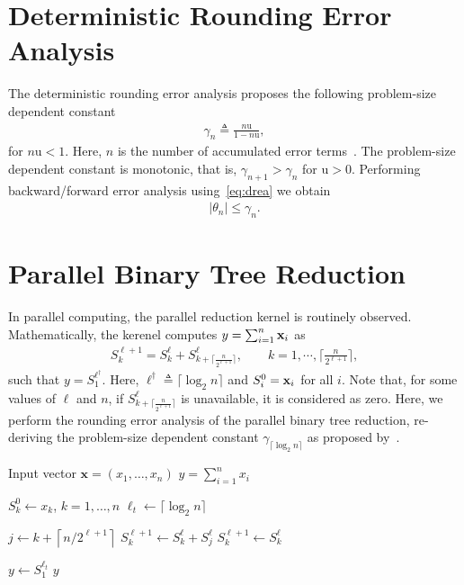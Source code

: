 \documentclass[11pt,draft]{article}
\newcommand{\urd}{\ensuremath{\mathrm{u}}}
\newcommand{\define}{\ensuremath{\triangleq}}
\newcommand{\vect}[1]{\mathbf{\MakeLowercase{#1}}}
\theoremstyle{definition}
\theoremstyle{remark}
\newcommand{\abs}[1]{\left|#1\right|}
\begin{document}
\section{Deterministic Rounding Error Analysis}
The deterministic rounding error analysis proposes the following problem-size dependent constant
\begin{align}
\gamma_{n} \define \frac{n\urd}{1 - n\urd}, 
\label{eq:drea}
\end{align}
for $n\urd < 1$.
Here, $n$ is the number of accumulated error terms~\cite{higham2002accuracy}.
The problem-size dependent constant is monotonic, that is, $\gamma_{n+1} > \gamma_{n}$ for $\urd > 0$.
Performing backward/forward error analysis using~\cref{eq:drea} we obtain
\begin{align}
    \abs{\theta_n} \leq \gamma_n.
\end{align}

\section{Parallel Binary Tree Reduction}\label{sec:parallel_binary_tree_reduction}
In parallel computing, the parallel reduction kernel is routinely observed.
Mathematically, the kerenel computes $y = \sum_{i=1}^n \vect{x}_i$ as
\begin{align}
S_{k}^{\ell+1} = S_{k}^{\ell} + S_{k + \lceil\frac{n}{2^{\ell+1}}\rceil}^\ell, \qquad k = 1, \cdots, \lceil \frac{n}{2^{\ell+1}}\rceil,
\end{align}
such that $y = S_1^{\ell^\dagger}$.
Here, $\ell^\dagger \define \lceil\log_2 n\rceil$ and $S_i^0 = \vect{x}_i$ for all $i$.
Note that, for some values of $\ell$ and $n$, if $S_{k + \lceil\frac{n}{2^{\ell+1}}\rceil}^\ell$ is unavailable, it is considered as zero.
Here, we perform the rounding error analysis of the parallel binary tree reduction, re-deriving the problem-size dependent constant $\gamma_{\lceil\log_2 n\rceil}$ as proposed by~\cite[p. 64]{higham2002accuracy}.


\begin{algorithm}
\caption{Parallel Binary-Tree Reduction}
\label{alg:binary_tree_reduction}
\begin{algorithmic}[1]
\Require Input vector $\mathbf{x} = (x_1,\ldots,x_n)$
\Ensure $y = \sum_{i=1}^{n} x_i$

\State $S_k^0 \gets x_k$, \quad $k=1,\ldots,n$
\State $\ell_t \gets \lceil \log_2 n \rceil$

        \State $j \gets k + \left\lceil n/2^{\ell+1}\right\rceil$
            \State $S_k^{\ell+1} \gets S_k^\ell + S_j^\ell$
        \Else
            \State $S_k^{\ell+1} \gets S_k^\ell$
        \EndIf
    \EndFor
\EndFor

\State $y \gets S_1^{\ell_t}$
\State \Return $y$
\end{algorithmic}
\end{algorithm}
\end{document}
